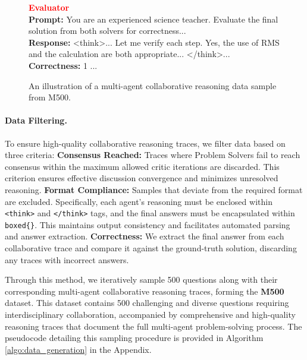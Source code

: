 \begin{figure}[t]
\begin{tcolorbox}
\begin{tcolorbox}[
  enhanced,
  colback=white,
  colframe=red,
  boxrule=0.5pt,
  sharp corners,
  left=1pt, right=1pt, top=1pt, bottom=1pt
]
\textcolor{red}{\textbf{Evaluator}} \\
\textbf{Prompt:} You are an experienced science teacher. Evaluate the final solution from both solvers for correctness... \\
\textbf{Response:}
\textless think\textgreater\space ... Let me verify each step. Yes, the use of RMS and the calculation are both appropriate... \textless/think\textgreater ... \textbf{Correctness:} 1 ...
\end{tcolorbox}
\end{tcolorbox}
\caption{An illustration of a multi-agent collaborative reasoning data sample from M500.}
\label{fig:data_sample}
\end{figure}



\paragraph{Data Filtering.}
To ensure high-quality collaborative reasoning traces, we filter data based on three criteria:  \textbf{Consensus Reached:} Traces where Problem Solvers fail to reach consensus within the maximum allowed critic iterations are discarded. This criterion ensures effective discussion convergence and minimizes unresolved reasoning.  \textbf{Format Compliance:} Samples that deviate from the required format are excluded. Specifically, each agent's reasoning must be enclosed within \texttt{<think>} and \texttt{</think>} tags, and the final answers must be encapsulated within \texttt{boxed\{\}}. This maintains output consistency and facilitates automated parsing and answer extraction.  \textbf{Correctness:} We extract the final answer from each collaborative trace and compare it against the ground-truth solution, discarding any traces with incorrect answers.

Through this method, we iteratively sample 500 questions along with their corresponding multi-agent collaborative reasoning traces, forming the \textbf{M500} dataset. This dataset contains 500 challenging and diverse questions requiring interdisciplinary collaboration, accompanied by comprehensive and high-quality reasoning traces that document the full multi-agent problem-solving process. The pseudocode detailing this sampling procedure is provided in Algorithm \ref{algo:data_generation} in the Appendix.

